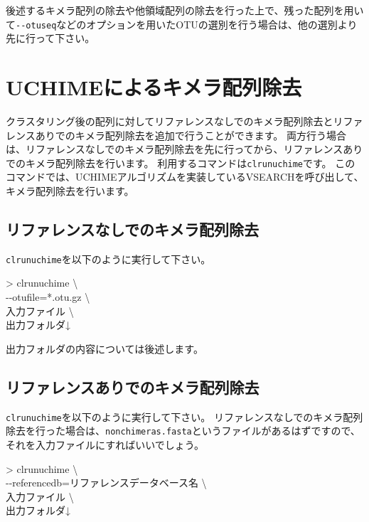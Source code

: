 \documentclass[titlepage,10pt,a4paper]{jsbook}
\newenvironment{cmd}{\begin{oframed}\raggedright\ttfamily\footnotesize\setlength{\baselineskip}{1.4em}}{\end{oframed}\vspace{-1em}}
\begin{document}
後述するキメラ配列の除去や他領域配列の除去を行った上で、残った配列を用いて\texttt{{-}{-}otuseq}などのオプションを用いたOTUの選別を行う場合は、他の選別より先に行って下さい。

\section{UCHIMEによるキメラ配列除去}

クラスタリング後の配列に対してリファレンスなしでのキメラ配列除去とリファレンスありでのキメラ配列除去を追加で行うことができます。
両方行う場合は、リファレンスなしでのキメラ配列除去を先に行ってから、リファレンスありでのキメラ配列除去を行います。
利用するコマンドは\texttt{clrunuchime}です。
このコマンドでは、UCHIMEアルゴリズムを実装しているVSEARCHを呼び出して、キメラ配列除去を行います。

\subsection{リファレンスなしでのキメラ配列除去}

\texttt{clrunuchime}を以下のように実行して下さい。

\begin{cmd}
{\textgreater} clrunuchime {\textbackslash}\\
{-}{-}otufile=*.otu.gz {\textbackslash}\\
入力ファイル {\textbackslash}\\
出力フォルダ↓
\end{cmd}

出力フォルダの内容については後述します。

\subsection{リファレンスありでのキメラ配列除去}

\texttt{clrunuchime}を以下のように実行して下さい。
リファレンスなしでのキメラ配列除去を行った場合は、\texttt{nonchimeras.fasta}というファイルがあるはずですので、それを入力ファイルにすればいいでしょう。

\begin{cmd}
{\textgreater} clrunuchime {\textbackslash}\\
{-}{-}referencedb=リファレンスデータベース名 {\textbackslash}\\
入力ファイル {\textbackslash}\\
出力フォルダ↓
\end{cmd}
\end{document}
